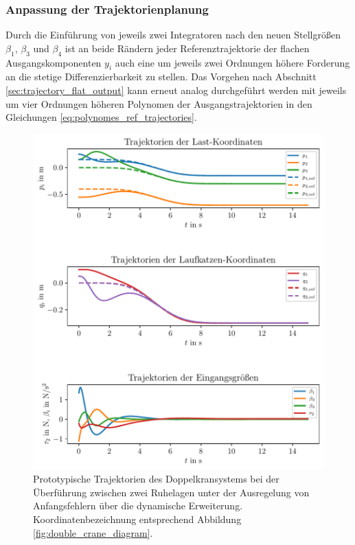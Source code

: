 \subsubsection{Anpassung der Trajektorienplanung}
Durch die Einführung von jeweils zwei Integratoren nach den neuen Stellgrößen $\beta_1$, $\beta_3$ und $\beta_4$ ist an beide Rändern jeder Referenztrajektorie der flachen Ausgangskomponenten $y_i$ auch eine um  jeweils zwei Ordnungen höhere Forderung an die stetige Differenzierbarkeit zu stellen. Das Vorgehen nach Abschnitt \ref{sec:trajectory_flat_output} kann erneut analog durchgeführt werden mit jeweils um vier Ordnungen höheren Polynomen der Ausgangstrajektorien in den Gleichungen \eqref{eq:polynomes_ref_trajectories}.

\begin{figure}[H]
	\begin{center}
		\includegraphics[scale=1]{Pictures/dyn_controller_initial_error}
	\end{center}
	\caption[Trajektorien Ruhelagenüberführung mit Regelung über dynamische Erweiterung]
	{Prototypische Trajektorien des Doppelkransystems bei der Überführung zwischen zwei Ruhelagen unter der Ausregelung von Anfangsfehlern über die dynamische Erweiterung. Koordinatenbezeichnung entsprechend Abbildung \ref{fig:double_crane_diagram}.}
	\label{fig_dyn_controller_initial_error}
\end{figure}


